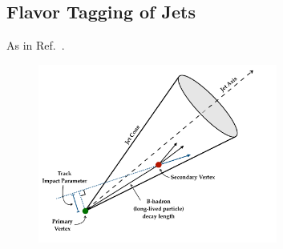 \subsection{Flavor Tagging of Jets}
\label{sec:flavor_tagging}

As in Ref.~\cite{ATL-PHYS-PUB-2017-013}.

\begin{figure}[!htb]
    \begin{center}
        \includegraphics[width=0.7\textwidth]{figures/chapter3/ftag/bhadron_decayPDF}
        \caption{
        }
        \label{fig:bjet_decay}
    \end{center}
\end{figure}






\FloatBarrier
